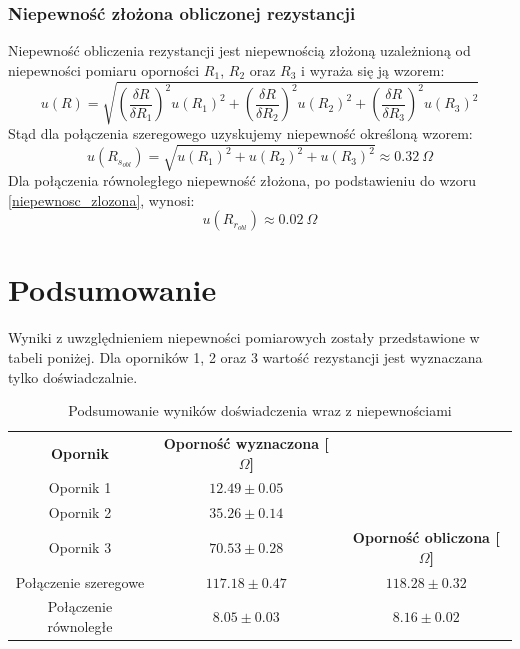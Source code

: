 \documentclass[a4paper,12pts]{article}
\begin{document}
\subsubsection{Niepewność złożona obliczonej rezystancji}
Niepewność obliczenia rezystancji jest niepewnością złożoną uzależnioną od niepewności pomiaru oporności $R_1$, $R_2$ oraz $R_3$ i wyraża się ją wzorem:
\begin{equation}
u(R) = \sqrt{\left( \frac{\delta R}{\delta R_1} \right)^2 u(R_1)^2 + \left( \frac{\delta R}{\delta R_2} \right)^2 u(R_2)^2 + \left( \frac{\delta R}{\delta R_3} \right)^2 u(R_3)^2}
\label{niepewnosc_zlozona}
\end{equation}
Stąd dla połączenia szeregowego uzyskujemy niepewność określoną wzorem:
\begin{equation}
u(R_{s_{obl}}) = \sqrt{u(R_1)^2 + u(R_2)^2 + u(R_3)^2} \approx 0.32~\Omega
\end{equation}
Dla połączenia równoległego niepewność złożona, po podstawieniu do wzoru \ref{niepewnosc_zlozona}, wynosi:
\begin{equation}
u(R_{r_{obl}}) \approx 0.02~\Omega
\end{equation}


\section{Podsumowanie}
Wyniki z uwzględnieniem niepewności pomiarowych zostały przedstawione w tabeli poniżej. Dla oporników 1, 2 oraz 3 wartość rezystancji jest wyznaczana tylko doświadczalnie.
\begin{table}[!h]
	\centering
	\begin{tabular}{| c | c | c |}
		\cline{1-2}
		\textbf{Opornik} & \textbf{Oporność wyznaczona [$\Omega$]} \\ \cline{1-2}
		Opornik 1 & $12.49 \pm 0.05$ \\ \cline{1-2}
		Opornik 2 & $35.26 \pm 0.14$ \\ \hline
		Opornik 3 & $70.53 \pm 0.28$ & \textbf{Oporność obliczona [$\Omega$]} \\ \hline
		Połączenie szeregowe & $117.18 \pm 0.47$ & $118.28 \pm 0.32$\\ \hline
		Połączenie równoległe & $8.05 \pm 0.03$ & $8.16 \pm 0.02$\\ \hline
	\end{tabular}
	\caption{Podsumowanie wyników doświadczenia wraz z niepewnościami}
\end{table}
\end{document}
